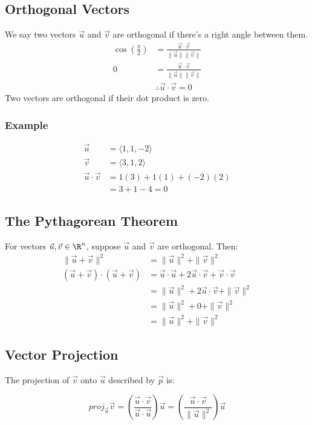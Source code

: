 \documentclass[letterpaper, 12pt]{math}
\begin{document}
\subsection*{Orthogonal Vectors}
We say two vectors \( \vec{u} \) and \( \vec{v} \) are orthogonal if there's
a right angle between them.
\begin{align*}
  \cos(\frac{\pi}{2}) &= \frac{\vec{u}\cdot\vec{v}}{\|\vec{u}\|\|\vec{v}\|} \\
  0 &= \frac{\vec{u}\cdot\vec{v}}{\|\vec{u}\|\|\vec{v}\|} \\
  &\therefore \vec{u}\cdot\vec{v} = 0
\end{align*}
Two vectors are orthogonal if their dot product is zero.

\subsubsection*{Example}
\begin{align*}
  \vec{u} &= \langle1,1,-2\rangle \\
  \vec{v} &= \langle3,1,2\rangle \\
  \vec{u}\cdot\vec{v} &= 1(3)+1(1)+(-2)(2) \\
  &= 3+1-4 = 0
\end{align*}

\subsection*{The Pythagorean Theorem}
For vectors \( \vec{u},\vec{v}\in\R^n \), suppose \( \vec{u} \) and
\( \vec{v} \) are orthogonal. Then:
\begin{align*}
  \|\vec{u}+\vec{v}\|^2 &= \|\vec{u}\|^2+\|\vec{v}\|^2 \\
  (\vec{u}+\vec{v})\cdot(\vec{u}+\vec{v}) &=
    \vec{u}\cdot\vec{u}+2\vec{u}\cdot\vec{v}+\vec{v}\cdot\vec{v} \\
  &= \|\vec{u}\|^2+2\vec{u}\cdot\vec{v}+\|\vec{v}\|^2 \\
  &= \|\vec{u}\|^2+0+\|\vec{v}\|^2 \\
  &= \|\vec{u}\|^2+\|\vec{v}\|^2
\end{align*}

\subsection*{Vector Projection}
The projection of \( \vec{v} \) onto \( \vec{u} \) described by \( \vec{p} \)
is:
\begin{center}
\end{center}
\[ proj_{\vec{u}}\vec{v} =
  (\frac{\vec{u}\cdot\vec{v}}{\vec{u}\cdot\vec{u}})\vec{u} =
  (\frac{\vec{u}\cdot\vec{v}}{\|\vec{u}\|^2})\vec{u} \]
\end{document}

